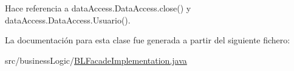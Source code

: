 Hace referencia a data\+Access.\+Data\+Access.\+close() y data\+Access.\+Data\+Access.\+Usuario().



La documentación para esta clase fue generada a partir del siguiente fichero\+:\begin{DoxyCompactItemize}
\item 
src/business\+Logic/\mbox{\hyperlink{BLFacadeImplementation_8java}{B\+L\+Facade\+Implementation.\+java}}\end{DoxyCompactItemize}
